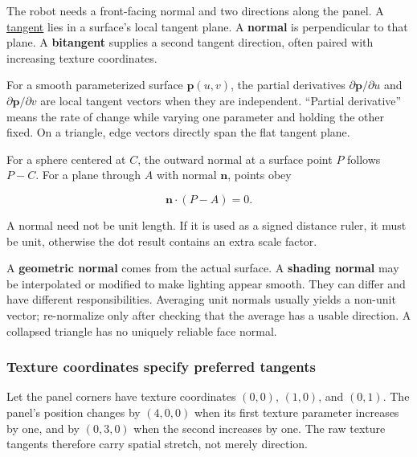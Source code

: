 \hypertarget{01-foundations-i-ch017-surface-movement-becomes-a-local-frame}{}

The robot needs a front-facing normal and two directions along the panel. A \hyperref[01-foundations-i-ch017-surface-movement-becomes-a-local-frame]{tangent} lies in a surface's local tangent plane. A \textbf{normal} is perpendicular to that plane. A \textbf{bitangent} supplies a second tangent direction, often paired with increasing texture coordinates.

For a smooth parameterized surface \(\mathbf p(u,v)\), the partial derivatives \(\partial\mathbf p/\partial u\) and \(\partial\mathbf p/\partial v\) are local tangent vectors when they are independent. ``Partial derivative'' means the rate of change while varying one parameter and holding the other fixed. On a triangle, edge vectors directly span the flat tangent plane.

For a sphere centered at \(C\), the outward normal at a surface point \(P\) follows \(P-C\). For a plane through \(A\) with normal \(\mathbf n\), points obey

\[
\mathbf n\cdot(P-A)=0.
\]

A normal need not be unit length. If it is used as a signed distance ruler, it must be unit, otherwise the dot result contains an extra scale factor.

A \textbf{geometric normal} comes from the actual surface. A \textbf{shading normal} may be interpolated or modified to make lighting appear smooth. They can differ and have different responsibilities. Averaging unit normals usually yields a non-unit vector; re-normalize only after checking that the average has a usable direction. A collapsed triangle has no uniquely reliable face normal.

\subsubsection{Texture coordinates specify preferred tangents}\label{01-foundations-i-ch017-texture-coordinates-specify-preferred-tangents}

\hypertarget{01-foundations-i-ch017-texture-coordinates-specify-preferred-tangents}{}

Let the panel corners have texture coordinates \((0,0)\), \((1,0)\), and \((0,1)\). The panel's position changes by \((4,0,0)\) when its first texture parameter increases by one, and by \((0,3,0)\) when the second increases by one. The raw texture tangents therefore carry spatial stretch, not merely direction.

